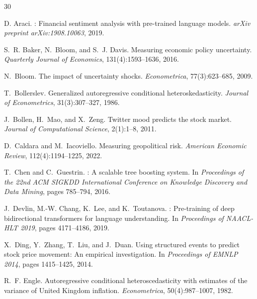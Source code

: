 \documentclass[12pt,a4paper]{report}
\begin{document}

\begin{thebibliography}{30}

D. Araci.
: Financial sentiment analysis with pre-trained language
  models.
\newblock \textit{arXiv preprint arXiv:1908.10063}, 2019.

S.~R. Baker, N.~Bloom, and S.~J. Davis.
\newblock Measuring economic policy uncertainty.
\newblock \textit{Quarterly Journal of Economics}, 131(4):1593--1636, 2016.

N.~Bloom.
\newblock The impact of uncertainty shocks.
\newblock \textit{Econometrica}, 77(3):623--685, 2009.

T.~Bollerslev.
\newblock Generalized autoregressive conditional heteroskedasticity.
\newblock \textit{Journal of Econometrics}, 31(3):307--327, 1986.

J.~Bollen, H.~Mao, and X.~Zeng.
\newblock Twitter mood predicts the stock market.
\newblock \textit{Journal of Computational Science}, 2(1):1--8, 2011.

D.~Caldara and M.~Iacoviello.
\newblock Measuring geopolitical risk.
\newblock \textit{American Economic Review}, 112(4):1194--1225, 2022.

T.~Chen and C.~Guestrin.
: A scalable tree boosting system.
\newblock In \textit{Proceedings of the 22nd ACM SIGKDD International
  Conference on Knowledge Discovery and Data Mining}, pages 785--794, 2016.

J.~Devlin, M.-W. Chang, K.~Lee, and K.~Toutanova.
: Pre-training of deep bidirectional transformers for language
  understanding.
\newblock In \textit{Proceedings of NAACL-HLT 2019}, pages 4171--4186, 2019.

X.~Ding, Y.~Zhang, T.~Liu, and J.~Duan.
\newblock Using structured events to predict stock price movement: An empirical
  investigation.
\newblock In \textit{Proceedings of EMNLP 2014}, pages 1415--1425, 2014.

R.~F. Engle.
\newblock Autoregressive conditional heteroscedasticity with estimates of the
  variance of {United Kingdom} inflation.
\newblock \textit{Econometrica}, 50(4):987--1007, 1982.


\end{thebibliography}
\end{document}
